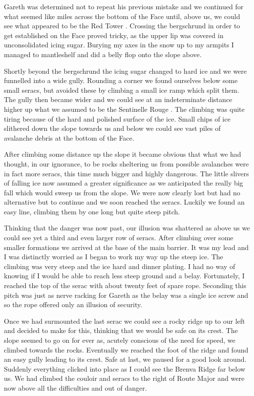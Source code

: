 \documentclass[a5paper,openany,font 10pt]{scrbook}
\begin{document}
Gareth was determined not to repeat his previous mistake and
we continued for what seemed like miles across the bottom of the
Face until, above us, we could see what appeared to be the  Red
Tower . Crossing the bergschrund in order to get established on
the Face proved tricky, as the upper lip was covered in
unconsolidated icing sugar. Burying my axes in the snow up to my
armpits I managed to mantleshelf and did a belly flop onto the
slope above.

Shortly beyond the bergschrund the icing sugar changed to
hard ice and we were funnelled into a wide gully. Rounding a
corner we found ourselves below some small seracs, but avoided
these by climbing a small ice ramp which split them. The gully
then became wider and we could see at an indeterminate distance
higher up what we assumed to be the  Sentinelle Rouge . The
climbing was quite tiring because of the hard and polished
surface of the ice. Small chips of ice slithered down the slope
towards us and below we could see vast piles of avalanche debris
at the bottom of the Face.

After climbing some distance up the slope it became obvious
that what we had thought, in our ignorance, to be rocks
sheltering us from possible avalanches were in fact more seracs,
this time much bigger and highly dangerous. The little slivers of
falling ice now assumed a greater significance as we anticipated
the really big fall which would sweep us from the slope. We were
now clearly lost but had no alternative but to continue and we
soon reached the seracs. Luckily we found an easy line, climbing
them by one long but quite steep pitch.

Thinking that the danger was now past, our illusion was
shattered as above us we could see yet a third and even larger
row of seracs. After climbing over some smaller formations we
arrived at the base of the main barrier. It was my lead and I was
distinctly worried as I began to work my way up the steep ice.
The climbing was very steep and the ice hard and dinner plating.
I had no way of knowing if I would be able to reach less steep
ground and a belay. Fortunately, I reached the top of the serac
with about twenty feet of spare rope. Seconding this pitch was
just as nerve racking for Gareth as the belay was a single ice
screw and so the rope offered only an illusion of security.

Once we had surmounted the last serac we could see a rocky
ridge up to our left and decided to make for this, thinking that
we would be safe on its crest. The slope seemed to go on for ever
as, acutely conscious of the need for speed, we climbed towards
the rocks. Eventually we reached the foot of the ridge and found
an easy gully leading to its crest. Safe at last, we paused for a
good look around. Suddenly everything clicked into place as I
could see the  Brenva Ridge  far below us. We had climbed the
couloir and seracs to the right of  Route Major  and were now above
all the difficulties and out of danger.
\end{document}
